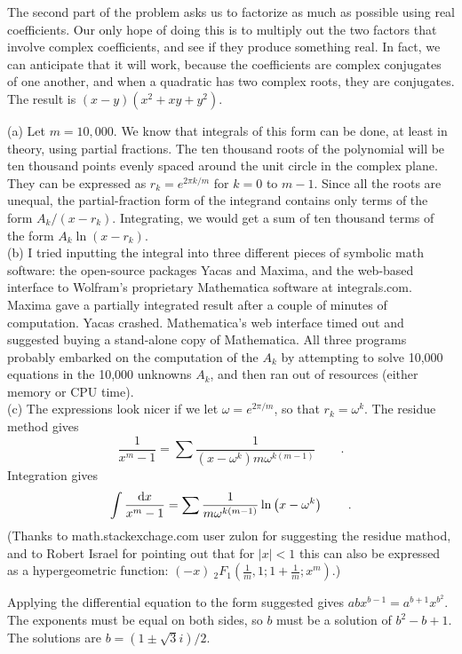 The second part of the problem asks us to factorize as much as possible using real coefficients.
Our only hope of doing this is to multiply out the two factors that involve complex coefficients,
and see if they produce something real. In fact, we can anticipate that it will work, because
the coefficients are complex conjugates of one another, and when a quadratic has two complex
roots, they are conjugates. The result is $(x-y)(x^2+xy+y^2)$.

(a) Let $m=10,000$. We know that integrals of this form can be done, at least in theory, using partial fractions.
The ten thousand roots of the polynomial will be ten thousand points evenly spaced around
the unit circle in the complex plane. They can be expressed as $r_k=e^{2\pi k/m}$ for $k=0$ to $m-1$.
Since all the roots are unequal, the partial-fraction form of the integrand contains only terms
of the form $A_k/(x-r_k)$. Integrating, we would get a sum of ten thousand terms of the form
$A_k\ln(x-r_k)$.\\
(b) I tried inputting the integral into three different pieces of symbolic
math software: the open-source packages Yacas and Maxima, and the web-based interface to
Wolfram's proprietary Mathematica software at integrals.com. Maxima gave a partially integrated result after a couple
of minutes of computation. Yacas crashed. Mathematica's web interface timed out and suggested
buying a stand-alone copy of Mathematica. All three programs probably embarked on the computation
of the $A_k$ by attempting to solve 10,000 equations in the 10,000 unknowns $A_k$, and then ran out
of resources (either memory or CPU time).\\
(c) The expressions look nicer if we let $\omega=e^{2\pi/m}$, so that $r_k=\omega^k$. The residue method gives
\begin{equation*}
  \frac{1}{x^m-1} = \sum \frac{1}{(x-\omega^k)m \omega^{k(m-1)}} \qquad .
\end{equation*}
Integration gives
\begin{equation*}
  \int \frac{\textup{d} x}{x^m-1} = \sum \frac{1}{m \omega^{k(m-1)}}\ln\left(x-\omega^k\right) \qquad .
\end{equation*}
(Thanks to math.stackexchage.com user zulon for suggesting the residue mathod, and to
Robert Israel for pointing out that for $|x|<1$ this can also be expressed as a hypergeometric function:
$(- x)\ {}_2F_1\left(\frac{1}{m},1; 1+\frac{1}{m}; x^m\right)$.)

Applying the differential equation to the form suggested gives $abx^{b-1}=a^{b+1}x^{b^2}$.
The exponents must be equal on both sides, so $b$ must be a solution of $b^2-b+1$. The solutions
are $b=(1\pm\sqrt{3}i)/2$.
